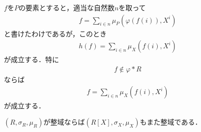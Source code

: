 	$f$を$P$の要素とすると，適当な自然数$n$を取って
	\begin{align}
		f = \sum_{i \in n} \mu_P \left(\varphi(f(i)),X^i\right)
	\end{align}
	と書けたわけであるが，このとき
	\begin{align}
		h(f) = \sum_{i \in n} \mu_X \left(f(i),X^i\right)
	\end{align}
	が成立する．特に
	\begin{align}
		f \notin \varphi \ast R
	\end{align}
	ならば
	\begin{align}
		f = \sum_{i \in n} \mu_X \left(f(i),X^i\right)
	\end{align}
	が成立する．
	
	$(R,\sigma_R,\mu_R)$が整域ならば$(R[X],\sigma_X,\mu_X)$もまた整域である．

